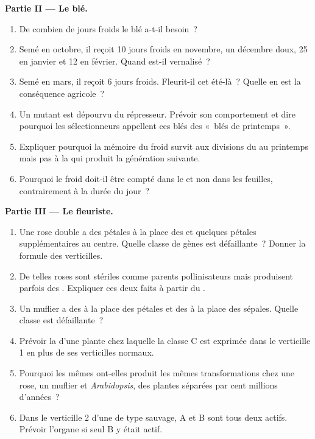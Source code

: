 \begin{problem}
\medskip
\noindent\textbf{Partie II --- Le blé.}
\begin{enumerate}[resume]
  \item De combien de jours froids le blé a-t-il besoin~?
  \item Semé en octobre, il reçoit 10 jours froids en novembre, un
        décembre doux, 25 en janvier et 12 en février. Quand est-il
        vernalisé~?
  \item Semé en mars, il reçoit 6 jours froids. Fleurit-il cet été-là~?
        Quelle en est la conséquence agricole~?
  \item Un mutant est dépourvu du répresseur. Prévoir son comportement et
        dire pourquoi les sélectionneurs appellent ces blés des «~blés de
        printemps~».
  \item Expliquer pourquoi la mémoire du froid survit aux divisions du
         au printemps mais pas à la  qui produit la
        génération suivante.
  \item Pourquoi le froid doit-il être compté dans le  et non
        dans les feuilles, contrairement à la durée du jour~?
\end{enumerate}

\medskip
\noindent\textbf{Partie III --- Le fleuriste.}
\begin{enumerate}[resume]
  \item Une rose double a des pétales à la place des  et
        quelques pétales supplémentaires au centre. Quelle classe de
        gènes est défaillante~? Donner la formule des verticilles.
  \item De telles roses sont stériles comme parents pollinisateurs mais
        produisent parfois des . Expliquer ces deux faits à partir
        du .
  \item Un muflier a des  à la place des pétales et des
         à la place des sépales. Quelle classe est défaillante~?
  \item Prévoir la  d'une plante chez laquelle la classe C est
        exprimée dans le verticille 1 en plus de ses verticilles
        normaux.
  \item Pourquoi les mêmes  ont-elles produit les mêmes
        transformations chez une rose, un muflier et \emph{Arabidopsis},
        des plantes séparées par cent millions d'années~?
  \item Dans le verticille 2 d'une  de type sauvage, A et B sont
        tous deux actifs. Prévoir l'organe si seul B y était actif.
\end{enumerate}


\end{problem}
